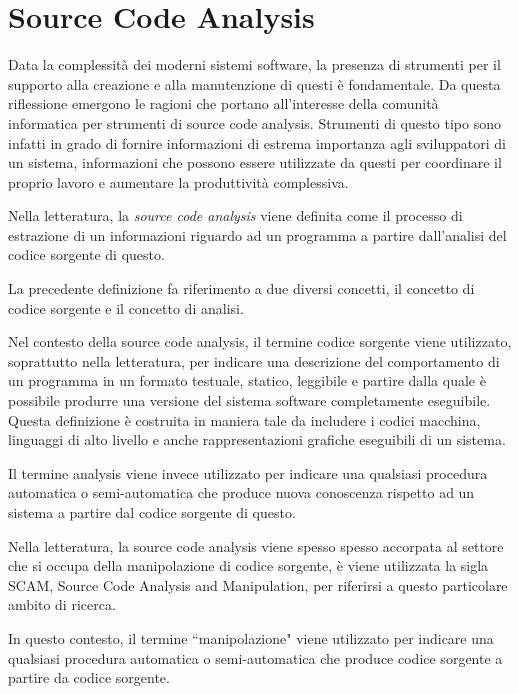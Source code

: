 \section{Source Code Analysis}
\label{source-code-analysis}

Data la complessità dei moderni sistemi software, la presenza di strumenti per
il supporto alla creazione e alla manutenzione di questi è fondamentale. Da
questa riflessione emergono le ragioni che portano all’interesse della comunità
informatica per strumenti di source code analysis. Strumenti di questo tipo sono
infatti in grado di fornire informazioni di estrema importanza agli sviluppatori
di un sistema, informazioni che possono essere utilizzate da questi per
coordinare il proprio lavoro e aumentare la produttività complessiva.

Nella letteratura, la \textit{source code analysis} viene definita come il
processo di estrazione di un informazioni riguardo ad un programma a partire
dall'analisi del codice sorgente di questo. \cite{DBLP:journals/jss/DeanHKV06}

La precedente definizione fa riferimento a due diversi concetti, il concetto di
codice sorgente e il concetto di analisi.

Nel contesto della source code analysis, il termine codice sorgente viene
utilizzato, soprattutto nella letteratura, per indicare una descrizione del
comportamento di un programma in un formato testuale, statico, leggibile e
partire dalla quale è possibile produrre una versione del sistema software
completamente eseguibile. Questa definizione è costruita in maniera tale da
includere i codici macchina, linguaggi di alto livello e anche rappresentazioni
grafiche eseguibili di un sistema.

Il termine analysis viene invece utilizzato per indicare una qualsiasi procedura
automatica o semi-automatica che produce nuova conoscenza rispetto ad un sistema
a partire dal codice sorgente di questo. \cite{DBLP:conf/icse/Binkley07}

Nella letteratura, la source code analysis viene spesso spesso accorpata al
settore che si occupa della manipolazione di codice sorgente, è viene utilizzata
la sigla SCAM, Source Code Analysis and Manipulation, per riferirsi a questo
particolare ambito di ricerca. \cite{DBLP:conf/scam/2001}

In questo contesto, il termine “manipolazione" viene utilizzato per indicare una
qualsiasi procedura automatica o semi-automatica che produce codice sorgente a
partire da codice sorgente.

